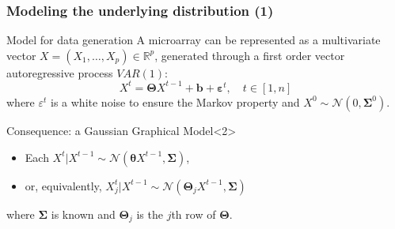\begin{frame}
  \frametitle{Modeling the underlying distribution (1)}
  
  \begin{block}{Model for data generation}
    A  microarray   can  be  represented  as   a  multivariate  vector
    $X=(X_1,\dots,X_p)\in\mathbb{R}^p$,  generated  through a
    \alert{first order vector autoregressive} process $VAR(1)$:
    \begin{equation*}
      X^{t}   =   \boldsymbol\Theta   X^{t-1}   +   \mathbf{b}   +
      \boldsymbol\varepsilon^{t},\quad t \in [1,n]
    \end{equation*}
    where  $\varepsilon^{t}$ is  a white  noise to  ensure  the Markov
    property and $X^{0} \sim \mathcal{N}(0, \boldsymbol\Sigma^0)$.
  \end{block}

   \vfill
 
   \begin{block}{Consequence: a Gaussian Graphical Model}<2>
     \begin{itemize}
     \item        Each       $X^{t}        |        X^{t-1}       \sim
       \mathcal{N}(\mathbf{\theta}X^{t-1}, \boldsymbol\Sigma)$, 
     \item  or,  equivalently,  $X_j^{t}  |  X^{t-1}  \sim
       \mathcal{N}(\boldsymbol\Theta_jX^{t-1}, \boldsymbol\Sigma)$
     \end{itemize}
     where $\boldsymbol\Sigma$ is known and $\boldsymbol\Theta_j$ is the
     $j$th row of $\boldsymbol\Theta$.
   \end{block}
 \end{frame}

